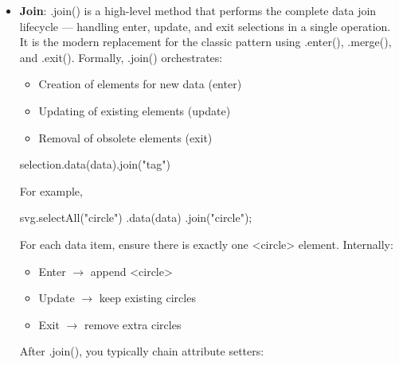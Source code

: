\documentclass{report}
\begin{document}
\begin{itemize}
\begin{jscode}
{                    selection.enter().append("rect")
                        .merge(selection)
                        .attr("x", 0)
                        .attr("y", (d,i) => i*90+50)
                        .attr("width", d => d)
                        .attr("height", 20)
                        .style("fill", "steelblue");
                }
            \end{jscode}
            \bigbreak \noindent 
            Here, the enter section is merged with the update section.
        \item \textbf{Join}: .join() is a high-level method that performs the complete data join lifecycle — handling enter, update, and exit selections in a single operation. It is the modern replacement for the classic pattern using .enter(), .merge(), and .exit().
            \bigbreak \noindent 
            Formally, .join() orchestrates:
            \begin{itemize}
                \item Creation of elements for new data (enter)
                \item Updating of existing elements (update)
                \item Removal of obsolete elements (exit)
            \end{itemize}
            \bigbreak \noindent 
            \begin{jscode}
                selection.data(data).join("tag")
            \end{jscode}
            \bigbreak \noindent 
            For example, 
            \bigbreak \noindent 
            \begin{jscode}
                svg.selectAll("circle")
                    .data(data)
                    .join("circle");
            \end{jscode}
            \bigbreak \noindent 
            For each data item, ensure there is exactly one <circle> element.
            \bigbreak \noindent 
            Internally:
            \begin{itemize}
                \item Enter $\to $ append <circle>
                \item Update $\to $ keep existing circles
                \item Exit $\to$ remove extra circles
            \end{itemize}
            After .join(), you typically chain attribute setters:
            \bigbreak \noindent 
            \begin{jscode}

\end{jscode}
\end{itemize}
\end{document}
